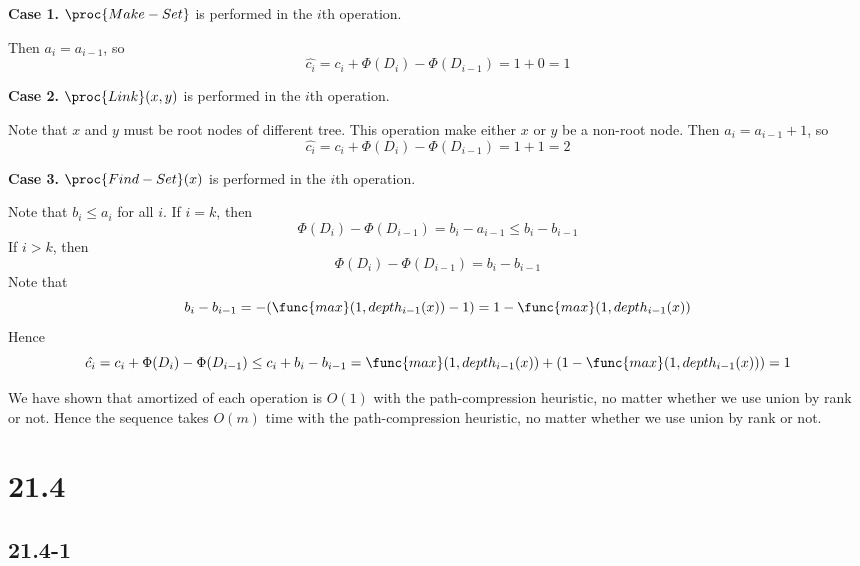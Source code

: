 \textbf{Case 1.}
$\proc{Make-Set}$ is performed in the $i$th operation.

Then $a_i = a_{i-1}$, so
\begin{equation*}
    \hat{c_i} = c_i + \Phi(D_i) - \Phi(D_{i-1})
    = 1 + 0 = 1
\end{equation*}

\textbf{Case 2.}
$\proc{Link}(x,y)$ is performed in the $i$th operation.

Note that $x$ and $y$ must be root nodes of different tree.
This operation make either $x$ or $y$ be a non-root node.
Then $a_i = a_{i-1} + 1$, so
\begin{equation*}
    \hat{c_i} = c_i + \Phi(D_i) - \Phi(D_{i-1})
    = 1 + 1 = 2
\end{equation*}

\textbf{Case 3.}
$\proc{Find-Set}(x)$ is performed in the $i$th operation.

Note that $b_i \leq a_i$ for all $i$.
If $i = k$, then 
\begin{equation*}
    \Phi(D_i) - \Phi(D_{i-1})
    = b_{i} - a_{i - 1}
    \leq b_{i} - b_{i - 1}
\end{equation*}
If $i > k$, then
\begin{equation*}
    \Phi(D_i) - \Phi(D_{i-1})
    = b_{i} - b_{i - 1}
\end{equation*}
Note that 
\begin{equation*}
    b_{i} - b_{i - 1} = - (\func{max}(1,depth_{i-1}(x)) - 1) = 1 - \func{max}(1,depth_{i-1}(x))
\end{equation*}
Hence 
\begin{equation*}
    \hat{c_i} = c_i + \Phi(D_i) - \Phi(D_{i-1})
    \leq c_i + b_{i} - b_{i - 1}
    = \func{max}(1,depth_{i-1}(x)) + (1 - \func{max}(1,depth_{i-1}(x)))
    = 1
\end{equation*}

We have shown that amortized of each operation is $O(1)$ 
with the path-compression heuristic,
no matter whether we use union by rank or not.
Hence the sequence takes $O(m)$ time 
with the path-compression heuristic,
no matter whether we use union by rank or not.

\section*{21.4}

\subsection*{21.4-1}

